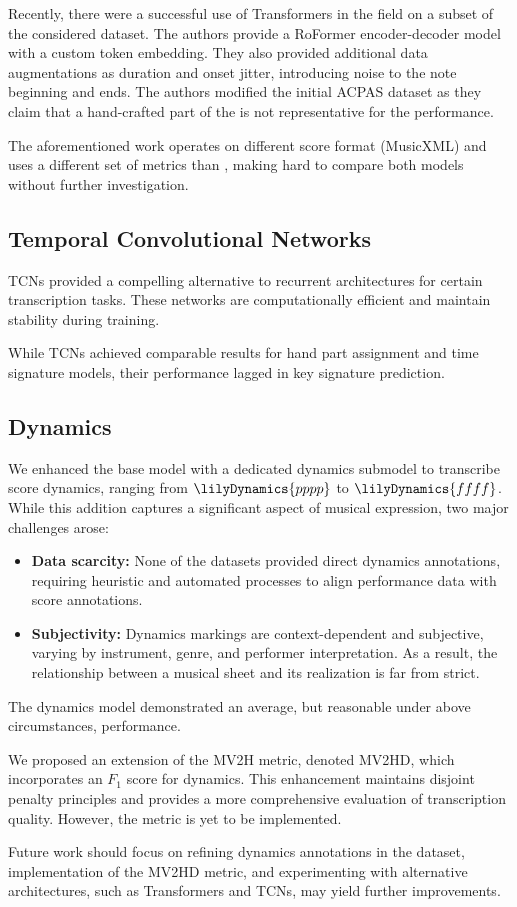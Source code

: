 Recently, there were a successful use of Transformers in the field \cite{Beyer2024} on a subset of the considered dataset. The authors provide a RoFormer encoder-decoder model with a custom token embedding. They also provided additional data augmentations as duration and onset jitter, introducing noise to the note beginning and ends. The authors modified the initial ACPAS dataset as they claim that a hand-crafted part of the is not representative for the performance. 

The aforementioned work operates on different score format (MusicXML) and uses a different set of metrics than \cite{Liu2022}, making hard to compare both models without further investigation.

\subsection{Temporal Convolutional Networks}

TCNs provided a compelling alternative to recurrent architectures for certain transcription tasks. These networks are computationally efficient and maintain stability during training.

While TCNs achieved comparable results for hand part assignment and time signature models, their performance lagged in key signature prediction.

\subsection{Dynamics}

We enhanced the base model with a dedicated dynamics submodel to transcribe score dynamics, ranging from $\lilyDynamics{pppp}$ to $\lilyDynamics{ffff}$. While this addition captures a significant aspect of musical expression, two major challenges arose: 	\begin{itemize}
	\item \textbf{Data scarcity:} None of the datasets provided direct dynamics annotations, requiring heuristic and automated processes to align performance data with score annotations.
	\item \textbf{Subjectivity:} Dynamics markings are context-dependent and subjective, varying by instrument, genre, and performer interpretation. As a result, the relationship between a musical sheet and its realization is far from strict.	\end{itemize}

The dynamics model demonstrated an average, but reasonable under above circumstances, performance.

We proposed an extension of the MV2H metric, denoted MV2HD, which incorporates an $F_1$ score for dynamics. This enhancement maintains disjoint penalty principles and provides a more comprehensive evaluation of transcription quality. However, the metric is yet to be implemented.

Future work should focus on refining dynamics annotations in the dataset, implementation of the MV2HD metric, and experimenting with alternative architectures, such as Transformers and TCNs, may yield further improvements.